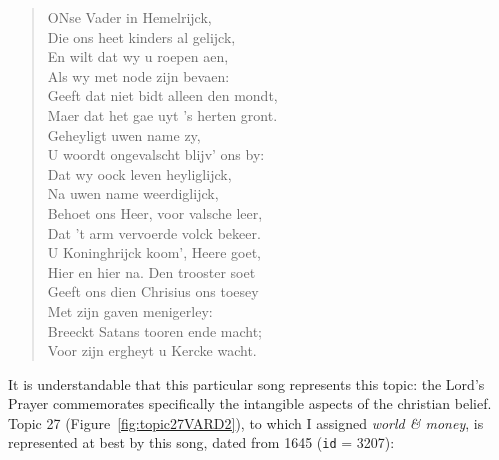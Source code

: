 \begin{quote}
	 ONse Vader in Hemelrijck,\\
	Die ons heet kinders al gelijck,\\
	En wilt dat wy u roepen aen,\\
	Als wy met node zijn bevaen:\\
	Geeft dat niet bidt alleen den mondt,\\
	Maer dat het gae uyt 's herten gront.\\
	
	Geheyligt uwen name zy,\\
	U woordt ongevalscht blijv' ons by:\\
	Dat wy oock leven heyliglijck,\\
	Na uwen name weerdiglijck,\\
	Behoet ons Heer, voor valsche leer,\\
	Dat 't arm vervoerde volck bekeer.\\
	
	U Koninghrijck koom', Heere goet,\\
	Hier en hier na. Den trooster soet\\
	Geeft ons dien Chrisius ons toesey\\
	Met zijn gaven menigerley:\\
	Breeckt Satans tooren ende macht;\\
	Voor zijn ergheyt u Kercke wacht.
\end{quote}

\noindent It is understandable that this particular song represents this topic: the Lord's Prayer commemorates specifically the intangible aspects of the christian belief. Topic 27 (Figure~\ref{fig:topic27VARD2}), to which I assigned \textit{world \& money}, is represented at best by this song, dated from 1645 (\texttt{id} = 3207):

